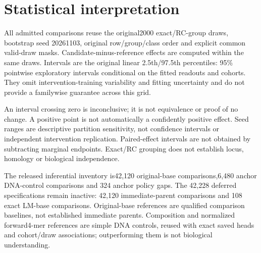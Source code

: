 \documentclass[11pt]{article}
\begin{document}
\section{Statistical interpretation}
All admitted comparisons reuse the original2000 exact/RC-group draws, bootstrap seed 20261103, original row/group/class order and explicit common valid-draw masks. Candidate-minus-reference effects are computed within the same draws. Intervals are the original linear 2.5th/97.5th percentiles: 95\% pointwise exploratory intervals conditional on the fitted readouts and cohorts. They omit intervention-training variability and fitting uncertainty and do not provide a familywise guarantee across this grid.\par
An interval crossing zero is inconclusive; it is not equivalence or proof of no change. A positive point is not automatically a confidently positive effect. Seed ranges are descriptive partition sensitivity, not confidence intervals or independent intervention replication. Paired-effect intervals are not obtained by subtracting marginal endpoints. Exact/RC grouping does not establish locus, homology or biological independence.\par
The released inferential inventory is42,120 original-base comparisons,6,480 anchor DNA-control comparisons and 324 anchor policy gaps. The 42,228 deferred specifications remain inactive: 42,120 immediate-parent comparisons and 108 exact LM-base comparisons. Original-base references are qualified comparison baselines, not established immediate parents. Composition and normalized forward4-mer references are simple DNA controls, reused with exact saved heads and cohort/draw associations; outperforming them is not biological understanding.\par
\end{document}
